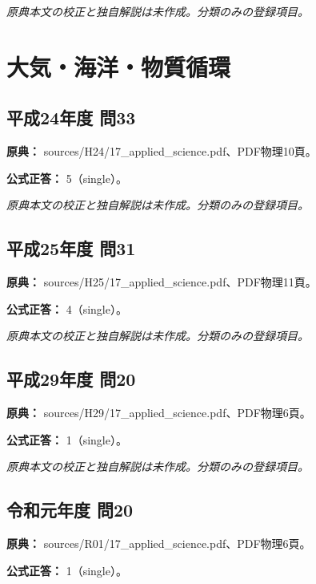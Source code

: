 \par\textit{原典本文の校正と独自解説は未作成。分類のみの登録項目。}

\section{大気・海洋・物質循環}

\subsection{平成24年度 問33}
\label{q:h24-reg-applied-33}

\noindent\textbf{原典：} sources/H24/17\_applied\_science.pdf、PDF物理10頁。

\textbf{公式正答：} 5（single）。

\par\textit{原典本文の校正と独自解説は未作成。分類のみの登録項目。}

\subsection{平成25年度 問31}
\label{q:h25-reg-applied-31}

\noindent\textbf{原典：} sources/H25/17\_applied\_science.pdf、PDF物理11頁。

\textbf{公式正答：} 4（single）。

\par\textit{原典本文の校正と独自解説は未作成。分類のみの登録項目。}

\subsection{平成29年度 問20}
\label{q:h29-reg-applied-20}

\noindent\textbf{原典：} sources/H29/17\_applied\_science.pdf、PDF物理6頁。

\textbf{公式正答：} 1（single）。

\par\textit{原典本文の校正と独自解説は未作成。分類のみの登録項目。}

\subsection{令和元年度 問20}
\label{q:r01-reg-applied-20}

\noindent\textbf{原典：} sources/R01/17\_applied\_science.pdf、PDF物理6頁。

\textbf{公式正答：} 1（single）。

